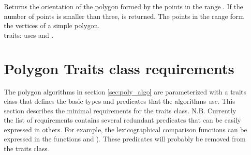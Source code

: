 {
Returns the orientation of the polygon formed by the points in the range
\ccStyle{[first,last)}. 
If the number of points is smaller than three,  is
returned.
\ccPrecond The points in the range \ccStyle{[first,last)}
form the vertices of a simple polygon.\\
{\sc traits}: uses  and .
}

\section{Polygon Traits class requirements}

The polygon algorithms in section \ref{sec:poly_algo} are parameterized with
a traits class  that defines the basic types and predicates
that the algorithms use. This section describes the minimal requirements for
the traits class. N.B. Currently the list of requirements contains several
redundant predicates that can be easily expressed in others. For example,
the lexicographical comparison functions can be expressed in the functions
 and ). These predicates will probably
be removed from the traits class.

